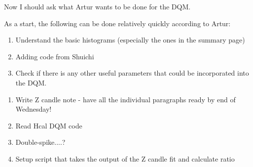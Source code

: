 Now I should ask what Artur wants to be done for the DQM.

As a start, the following can be done relatively quickly according to Artur:

\begin{enumerate}
\item Understand the basic histograms (especially the ones in the summary page)
\item Adding code from Shuichi
\item Check if there is any other useful parameters that could be incorporated into the DQM.
\end{enumerate}



\begin{enumerate}
\item Write Z candle note - have all the individual paragraphs ready by end of Wednesday!
\item Read Hcal DQM code
\item Double-spike....?
\item Setup script that takes the output of the Z candle fit and calculate ratio
\end{enumerate}


